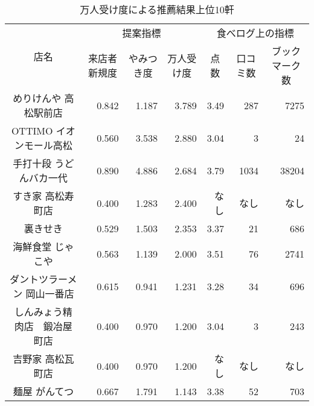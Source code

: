 \begin{table}[H]
\centering
\caption{万人受け度による推薦結果上位10軒}
\label{table:scrutiny:acceptability}
\small
\begin{tabular}{|c|r|r|r|r|r|r|}
\hline
\multirow{2}{*}{店名} & \multicolumn{3}{c|}{提案指標} & \multicolumn{3}{c|}{食べログ上の指標} \\ \cline{2-7}
 & \multicolumn{1}{c|}{来店者新規度} & \multicolumn{1}{c|}{やみつき度} & \multicolumn{1}{c|}{万人受け度} & \multicolumn{1}{c|}{点数} & \multicolumn{1}{c|}{口コミ数} & \multicolumn{1}{c|}{ブックマーク数} \\ \hline
めりけんや 高松駅前店 & 0.842 & 1.187 & 3.789 & 3.49 & 287 & 7275 \\ \hline
OTTIMO イオンモール高松 & 0.560 & 3.538 & 2.880 & 3.04 & 3 & 24 \\ \hline
手打十段 うどんバカ一代 & 0.890 & 4.886 & 2.684 & 3.79 & 1034 & 38204 \\ \hline
すき家 高松寿町店 & 0.400 & 1.283 & 2.400 & なし & なし & なし \\ \hline
裏きせき & 0.529 & 1.503 & 2.353 & 3.37 & 21 & 686 \\ \hline
海鮮食堂 じゃこや & 0.563 & 1.139 & 2.000 & 3.51 & 76 & 2741 \\ \hline
ダントツラーメン 岡山一番店 & 0.615 & 0.941 & 1.231 & 3.28 & 34 & 696 \\ \hline
しんみょう精肉店　鍛冶屋町店 & 0.400 & 0.970 & 1.200 & 3.04 & 3 & 243 \\ \hline
吉野家 高松瓦町店 & 0.400 & 0.970 & 1.200 & なし & なし & なし \\ \hline
麺屋 がんてつ & 0.667 & 1.791 & 1.143 & 3.38 & 52 & 703 \\ \hline
\end{tabular}
\end{table}
